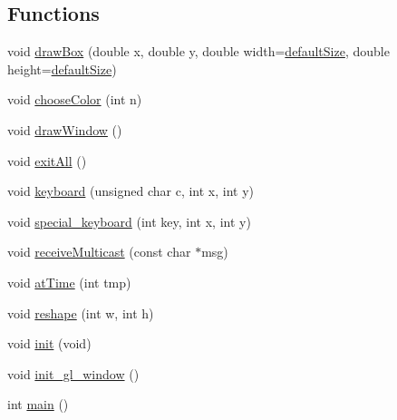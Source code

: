 \subsection*{Functions}
\begin{DoxyCompactItemize}
\item 
void \hyperlink{proto-multiplayer_8cpp_a069c398f6dfe642eceb7c72a566a390c}{draw\+Box} (double x, double y, double width=\hyperlink{proto-multiplayer_8cpp_a62f8a3bc5feeb19a0bffdc85d657c0cd}{default\+Size}, double height=\hyperlink{proto-multiplayer_8cpp_a62f8a3bc5feeb19a0bffdc85d657c0cd}{default\+Size})
\item 
void \hyperlink{proto-multiplayer_8cpp_a6885b83febd9588a71c5d5458dfe180c}{choose\+Color} (int n)
\item 
void \hyperlink{proto-multiplayer_8cpp_a40c8660a304830add6a8d281c7bc2813}{draw\+Window} ()
\item 
void \hyperlink{proto-multiplayer_8cpp_a349ed9ac7f18536c63d4b10d41b9138a}{exit\+All} ()
\item 
void \hyperlink{proto-multiplayer_8cpp_a6e07312b3a723a9e37e9c5df2a065f2e}{keyboard} (unsigned char c, int x, int y)
\item 
void \hyperlink{proto-multiplayer_8cpp_afd34ae2cff2075bf4f03835a55204592}{special\+\_\+keyboard} (int key, int x, int y)
\item 
void \hyperlink{proto-multiplayer_8cpp_a2bf3e92f6c0f829ebb38f7b32accf2b0}{receive\+Multicast} (const char $\ast$msg)
\item 
void \hyperlink{proto-multiplayer_8cpp_a318b84167b4ec81faed01f07d4a99bfa}{at\+Time} (int tmp)
\item 
void \hyperlink{proto-multiplayer_8cpp_acc1ffe65e6869931318610cae7210078}{reshape} (int w, int h)
\item 
void \hyperlink{proto-multiplayer_8cpp_a2858154e2009b0e6e616f313177762bc}{init} (void)
\item 
void \hyperlink{proto-multiplayer_8cpp_a5fd5da323be71ae7b0e03ee058f47181}{init\+\_\+gl\+\_\+window} ()
\item 
int \hyperlink{proto-multiplayer_8cpp_ae66f6b31b5ad750f1fe042a706a4e3d4}{main} ()
\end{DoxyCompactItemize}
